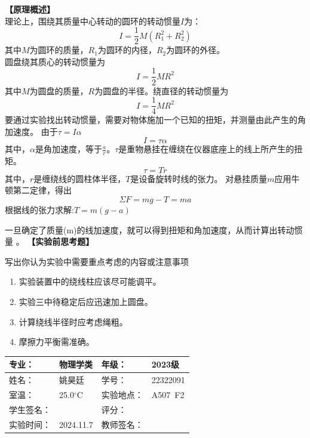 \documentclass[dvipsnames, svgnames,a4paper,11pt]{article}
\begin{document}
\textbf{【原理概述】}\\

理论上，围绕其质量中心转动的圆环的转动惯量$I$为：
$$I=\frac{1}{2}M(R_1^2+R_2^2)$$
其中$M$为圆环的质量，$R_1$为圆环的内径，$R_2$为圆环的外径。\\
圆盘绕其质心的转动惯量为
$$I=\frac{1}{2}MR^2$$
其中$M$为圆盘的质量，$R$为圆盘的半径。绕直径的转动惯量为
$$I=\frac{1}{4}MR^2$$
要通过实验找出转动惯量，需要对物体施加一个已知的扭矩，并测量由此产生的角加速度。
由于$\tau=I\alpha$
$$I=\tau\alpha$$
其中，$\alpha$是角加速度，等于$\frac{a}{r}$。$\tau$是重物悬挂在缠绕在仪器底座上的线上所产生的扭矩。
$$\tau=Tr$$
其中，$r$是缠绕线的圆柱体半径，$T$是设备旋转时线的张力。
对悬挂质量$m$应用牛顿第二定律，得出
$$\Sigma F=mg-T=ma$$
根据线的张力求解:$T=m(g-a)$

一旦确定了质量(m)的线加速度，就可以得到扭矩和角加速度，从而计算出转动惯量 。
\textbf{【实验前思考题】}
\begin{question}
	写出你认为实验中需要重点考虑的内容或注意事项
    \tcblower
    \begin{enumerate}
		\item 实验装置中的绕线柱应该尽可能调平。
		\item 实验三中待稳定后应迅速加上圆盘。
		\item 计算绕线半径时应考虑绳粗。
		\item 摩擦力平衡需准确。
	\end{enumerate}
\end{question}


\clearpage
{}
\begin{table}
	\renewcommand\arraystretch{1.7}
	\centering
	\begin{tabularx}{\textwidth}{|X|X|X|X|}
	\hline
	专业：& 物理学类 &年级：& 2023级 \\
	\hline
	姓名：& 姚昊廷 &学号：&22322091  \\
	\hline
	室温：&25.0$^\circ$C&实验地点：&A507\ F2\\
	\hline
	学生签名：& & 评分： &\\
	\hline
	实验时间：& 2024.11.7& 教师签名：&\\
	\hline
	\end{tabularx}
\end{table}
\end{document}
